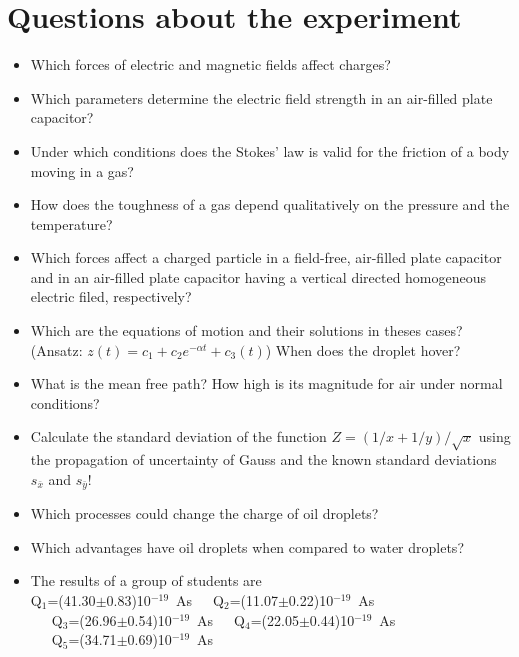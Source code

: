 \documentclass{tudphygp_eng}
\begin{document}
\section{Questions about the experiment}

\begin{itemize}
\item Which forces of electric and magnetic fields affect charges?
 
\item Which parameters determine the electric field strength in an air-filled plate capacitor?

\item Under which conditions does the Stokes' law is valid for the friction of a body moving in a gas?

\item How does the toughness of a gas depend qualitatively on the pressure and the temperature?

\item Which forces affect a charged particle in a field-free, air-filled plate capacitor and in an air-filled plate capacitor having a vertical directed homogeneous electric filed, respectively?

\item Which are the equations of motion and their solutions in theses cases? (Ansatz: $z(t)={c_1}+{c_2}e^{-{\alpha}t}+{c_3}(t)$) When does the droplet hover?

\item What is the mean free path? How high is its magnitude for air under normal conditions?

\item Calculate the standard deviation of the function $Z=(1/x + 1/y)/\sqrt{x}$ using the propagation of uncertainty of Gauss and the known standard deviations $s_{\bar{x}}$ and $s_{\bar{y}}$!

\item Which processes could change the charge of oil droplets?

\item Which advantages have oil droplets when compared to water droplets?

\item The results of a group of students are \\

Q$_1$=(41.30$\pm$0.83)10$^{-19}$~As~~~Q$_2$=(11.07$\pm$0.22)10$^{-19}$~As\\
~~~Q$_3$=(26.96$\pm$0.54)10$^{-19}$~As~~~Q$_4$=(22.05$\pm$0.44)10$^{-19}$~As\\
~~~Q$_5$=(34.71$\pm$0.69)10$^{-19}$~As\\


\end{itemize}
\end{document}
